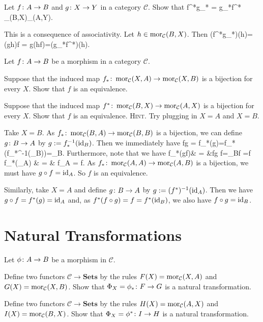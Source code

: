 \bp
Let $f\colon A \to B$ and $g\colon X\to Y$ in a category $\mathcal{C}$. Show that
\bse
f^*\circ g_* = g_*\circ f^* \cl \mor_{}(B,X)\to \mor_{}(A,Y).
\ese
\ep

\bs
This is a consequence of associativity. Let $h\in \operatorname{mor}_{\mathcal{C}}(B,X)$. Then
(f^*\circ g_*)(h)=(g\circ h)\circ f = g\circ (h\circ f)=(g_*\circ f^*)(h).
\ei
\es

\bp
Let $f\colon A \to B$ be a morphism in a category $\mathcal{C}$.
\ben[label=(\alph*)]
\item Suppose that the induced map $f_* \colon \operatorname{mor}_{\mathcal{C}}(X,A)\to \operatorname{mor}_{\mathcal{C}}(X,B)$ is a bijection for every $X$. Show that $f$ is an equivalence.
\item Suppose that the induced map $f^* \colon \operatorname{mor}_{\mathcal{C}}(B,X)\to \operatorname{mor}_{\mathcal{C}}(A,X)$ is a bijection for every $X$. Show that $f$ is an equivalence.
\een
{\scshape Hint}. Try plugging in $X=A$ and $X=B$.
\ep

\bs
\ben[label=(\alph*)]
\item Take $X=B$. As $f_*\colon \operatorname{mor}_{\mathcal{C}}(B,A)\to \operatorname{mor}_{\mathcal{C}}(B,B)$ is a bijection, we can define $g\colon B\to A$ by $g:=f_*^{-1}(\mathrm{id}_B)$. Then we immediately have
\bse
f\circ g = f_*(g)=f_*(f_*^{-1}(\id_B))=\id_B.
\ese
Furthermore, note that we have
f_*(g\circ f)& = &f\circ g \circ f=\id_B\circ f =f\\
f_*(\id_A) & = & f\circ \id_A = f.
\ei
As $f_*\colon \operatorname{mor}_{\mathcal{C}}(A,A)\to \operatorname{mor}_{\mathcal{C}}(A,B)$ is a bijection, we must have $g\circ f=\mathrm{id}_A$. So $f$ is an equivalence.
\item Similarly, take $X=A$ and define $g\colon B\to A$ by $g:=(f^*)^{-1}(\mathrm{id}_A)$. Then we have $g\circ f=f^*(g)=\mathrm{id}_A$ and, as $f^*(f\circ g)=f=f^*(\mathrm{id}_B)$, we also have $f\circ g=\mathrm{id}_B$.
\een
\es


\section{Natural Transformations}

\bp
Let $\phi \colon A \to B$ be a morphism in $\mathcal{C}$.
\ben[label=(\alph*)]
\item Define two functors $\mathcal{C} \to \mathbf{Sets}$ by the rules $F(X) = \operatorname{mor}_{\mathcal{C}}(X,A)$ and $G(X) = \operatorname{mor}_{\mathcal{C}}(X,B)$. Show that $\Phi_X = \phi_* \colon F \to G$ is a natural transformation.
\item Define two functors $\mathcal{C} \to \mathbf{Sets}$ by the rules $H(X) = \operatorname{mor}_{\mathcal{C}}(A,X)$ and $I(X) = \operatorname{mor}_{\mathcal{C}}(B,X)$. Show that $\Phi_X = \phi^* \colon I \to H$ is a natural transformation.
\een
\ep

